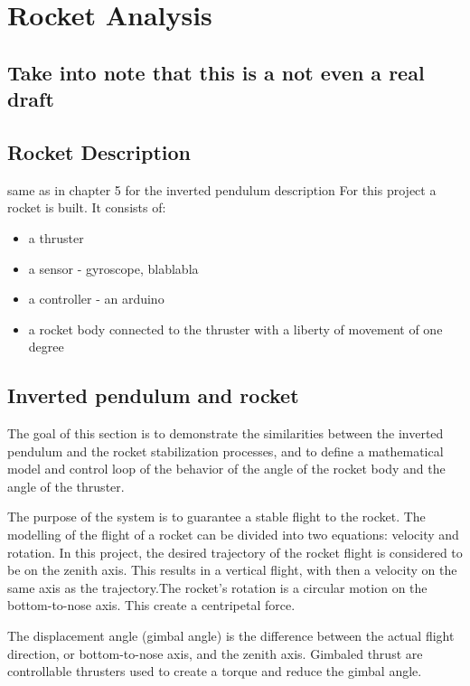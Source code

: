 							\chapter{Rocket Analysis}

		\section{Take into note that this is a not even a real draft}
		
	\section{ Rocket Description}

same as in chapter 5 for the inverted pendulum description
For this project a rocket is built. It consists of:
\begin{itemize}
\item a thruster
\item a sensor - gyroscope, blablabla
\item a controller - an arduino
\item a rocket body connected to the thruster with a liberty of movement of one degree
\end{itemize}

	\section{Inverted pendulum and rocket}
The goal of this section is to demonstrate the similarities between the inverted pendulum and the rocket stabilization processes, and to define a mathematical model and control loop of the behavior of the angle of the rocket body and the angle of the thruster.

The purpose of the system is to guarantee a stable flight to the rocket.
The modelling of the flight of a rocket can be divided into two equations: velocity and rotation. In this project, the desired trajectory of the rocket flight is considered to be on the zenith axis. This results in a vertical flight, with then a velocity on the same axis as the trajectory.The rocket's rotation is a circular motion on the bottom-to-nose axis. This create a centripetal force.

The displacement angle (gimbal angle) is the difference between the actual flight direction, or bottom-to-nose axis, and the zenith axis. Gimbaled thrust are controllable thrusters used to create a torque and reduce the gimbal angle. 

